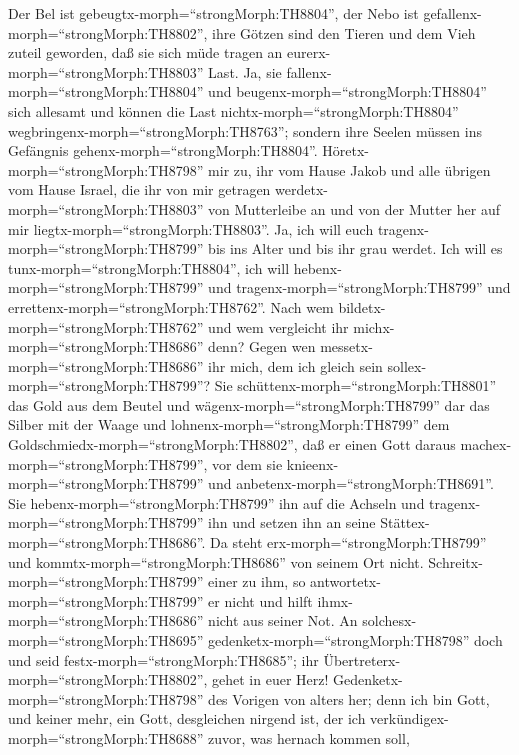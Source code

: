  Der Bel ist gebeugtx-morph=``strongMorph:TH8804'', der Nebo
ist gefallenx-morph=``strongMorph:TH8802'', ihre Götzen sind den Tieren
und dem Vieh zuteil geworden, daß sie sich müde tragen an
eurerx-morph=``strongMorph:TH8803'' Last.  Ja, sie
fallenx-morph=``strongMorph:TH8804'' und
beugenx-morph=``strongMorph:TH8804'' sich allesamt und können die Last
nichtx-morph=``strongMorph:TH8804''
wegbringenx-morph=``strongMorph:TH8763''; sondern ihre Seelen müssen ins
Gefängnis gehenx-morph=``strongMorph:TH8804''. 
Höretx-morph=``strongMorph:TH8798'' mir zu, ihr vom Hause Jakob und alle
übrigen vom Hause Israel, die ihr von mir getragen
werdetx-morph=``strongMorph:TH8803'' von Mutterleibe an und von der
Mutter her auf mir liegtx-morph=``strongMorph:TH8803''.  Ja,
ich will euch tragenx-morph=``strongMorph:TH8799'' bis ins Alter und bis
ihr grau werdet. Ich will es tunx-morph=``strongMorph:TH8804'', ich will
hebenx-morph=``strongMorph:TH8799'' und
tragenx-morph=``strongMorph:TH8799'' und
errettenx-morph=``strongMorph:TH8762''.  Nach wem
bildetx-morph=``strongMorph:TH8762'' und wem vergleicht ihr
michx-morph=``strongMorph:TH8686'' denn? Gegen wen
messetx-morph=``strongMorph:TH8686'' ihr mich, dem ich gleich sein
sollex-morph=``strongMorph:TH8799''?  Sie
schüttenx-morph=``strongMorph:TH8801'' das Gold aus dem Beutel und
wägenx-morph=``strongMorph:TH8799'' dar das Silber mit der Waage und
lohnenx-morph=``strongMorph:TH8799'' dem
Goldschmiedx-morph=``strongMorph:TH8802'', daß er einen Gott daraus
machex-morph=``strongMorph:TH8799'', vor dem sie
knieenx-morph=``strongMorph:TH8799'' und
anbetenx-morph=``strongMorph:TH8691''.  Sie
hebenx-morph=``strongMorph:TH8799'' ihn auf die Achseln und
tragenx-morph=``strongMorph:TH8799'' ihn und setzen ihn an seine
Stättex-morph=``strongMorph:TH8686''. Da steht
erx-morph=``strongMorph:TH8799'' und kommtx-morph=``strongMorph:TH8686''
von seinem Ort nicht. Schreitx-morph=``strongMorph:TH8799'' einer zu
ihm, so antwortetx-morph=``strongMorph:TH8799'' er nicht und hilft
ihmx-morph=``strongMorph:TH8686'' nicht aus seiner Not.  An
solchesx-morph=``strongMorph:TH8695''
gedenketx-morph=``strongMorph:TH8798'' doch und seid
festx-morph=``strongMorph:TH8685''; ihr
Übertreterx-morph=``strongMorph:TH8802'', gehet in euer Herz!
 Gedenketx-morph=``strongMorph:TH8798'' des Vorigen von
alters her; denn ich bin Gott, und keiner mehr, ein Gott, desgleichen
nirgend ist,  der ich
verkündigex-morph=``strongMorph:TH8688'' zuvor, was hernach kommen soll,
